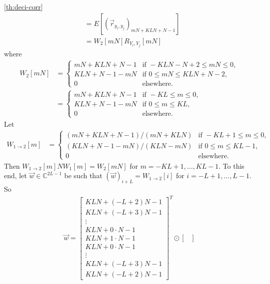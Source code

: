 \documentclass[a4paper, openany, oneside]{memoir}
\begin{document}
\begin{blockProofTheorem}{\ref{th:deci-corr}}
\begin{align*}
        &=E[(\vec{r}_{y_i,y_j})_{mN+KLN+N-1}] \\
        &= W_2[mN] R_{Y_i,Y_j}[mN]
    \end{align*}
    where
    \begin{align*}
        W_2[mN] &= \begin{cases}
            mN+KLN+N-1 & \text{if } -KLN-N+2 \le mN \le 0, \\
            KLN+N-1-mN& \text{if } 0 \le mN \le KLN+N-2, \\
            0 & \text{elsewhere.}
        \end{cases} \\
        &= \begin{cases}
            mN+KLN+N-1 & \text{if } -KL\le m \le 0, \\
            KLN+N-1-mN& \text{if } 0 \le m \le KL, \\
            0 & \text{elsewhere.}
        \end{cases}
    \end{align*}
    Let
    \begin{align*}
        W_{1 \to 2}[m] &= \begin{cases}
            (mN+KLN+N-1)/(mN+KLN) & \text{if } -KL+1 \le m \le 0, \\
            (KLN+N-1-mN)/(KLN-mN) & \text{if } 0 \le m \le KL-1, \\
            0 & \text{elsewhere.}
        \end{cases}
    \end{align*}
    Then $W_{1 \to 2}[m] N W_1[m] = W_2[mN]$ for $m = -KL+1,\ldots,KL-1$. To this end, let $\vec{w} \in \mathbb{C}^{2L-1}$ be such that $(\vec{w})_{i+L}=W_{1 \to 2}[i]$ for $i = -L+1,\ldots,L-1$. So
    \begin{align*}
        \vec{w} = \begin{bmatrix}
            KLN+(-L+2)N-1 \\
            KLN+(-L+3)N-1 \\
            \vdots \\
            KLN+0\cdot N-1 \\
            KLN+1\cdot N-1 \\
            KLN+0\cdot N-1 \\
            \vdots \\
            KLN+(-L+3)N-1 \\
            KLN+(-L+2)N-1
         \end{bmatrix}^T \odot \begin{bmatrix}

\end{bmatrix}
\end{align*}
\end{blockProofTheorem}
\end{document}
